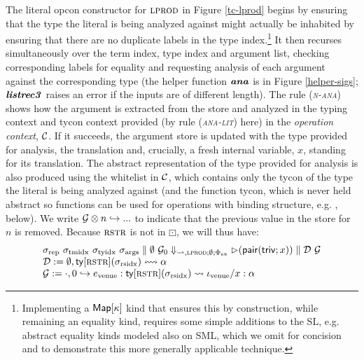 \documentclass[9pt,preprint]{sigplanconf}
\newcommand{\rulename}[1]{({\textsc{\textsl{#1}}})}
\begin{document}
The literal opcon constructor for $\textsc{lprod}$ in Figure \ref{tc-lprod} begins by ensuring that the type the literal is being analyzed against might actually be inhabited by ensuring that there are no duplicate labels in the type index.\footnote{Implementing a ${\sf Map}[\kappa]$ kind that ensures this by construction, while remaining an equality kind, requires some simple additions to the SL, e.g. abstract equality kinds modeled also on SML, which we omit for concision and to demonstrate this more generally applicable technique.} It then recurses simultaneously over the term index, type index and argument list, checking corresponding labels for equality and requesting analysis of each argument against the corresponding type (the helper function ${\textbf{\textit{ana}}}$ is in Figure \ref{helper-sigs}; ${\textbf{\textit{listrec3}}}$ raises an error if the inputs are of different length). The rule \rulename{n-ana} shows how the argument is extracted from the store and analyzed in the typing context and tycon context provided (by rule \rulename{ana-lit} here) in the \emph{operation context}, $\mathcal{C}$. If it succeeds, the argument store is updated with the type provided for analysis, the translation and, crucially, a fresh internal variable, $x$, standing for its translation. The abstract representation of the type provided for analysis is also produced using the whitelist in $\mathcal{C}$, which contains only the tycon of the type the literal is being analyzed against (and the function tycon, which is never held abstract so functions can be used for operations with binding structure, e.g. , below). We write $\mathcal{G} \otimes n \hookrightarrow ...$ to indicate that the previous value in the store for $n$ is removed. Because $\textsc{rstr}$ is not in $\boxdot$, we will thus have:\footnotesize\[\begin{array}{l}
\sigma_\text{rep}~\sigma_\text{tmidx}~\sigma_\text{tyidx}~\sigma_\text{args} \parallel \emptyset~\mathcal{G}_0 \Downarrow_{{\rightharpoonup},\textsc{lprod}; \emptyset; \Phi_\text{ex}} {\rhd}({\sf pair}({\sf triv}; x)) \parallel \mathcal{D}~\mathcal{G}\\
\mathcal{D} := \emptyset, {\sf ty}[\textsc{rstr}](\sigma_\text{rsidx}) \leftrightsquigarrow \alpha\\
\mathcal{G} := \cdot, 0 \hookrightarrow e_\text{venue} : {\sf ty}[\textsc{rstr}](\sigma_\text{rsidx}) \leadsto \iota_\text{venue}/x : \alpha
\end{array}
\]\normalsize
\end{document}
